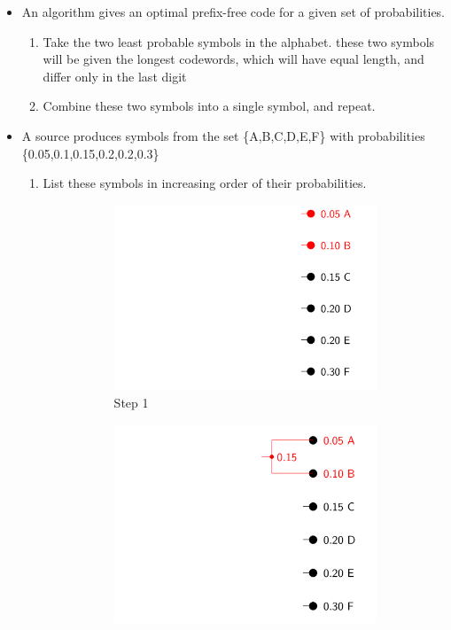 \documentclass[12pt]{article}
\begin{document}
\begin{itemize}
\item An algorithm gives an optimal prefix-free code for a given set of probabilities.
\begin{enumerate}
\item Take the two least probable symbols in the alphabet. these two symbols will be given the longest codewords, which will have equal length, and differ only in the last digit
\item Combine these two symbols into a single symbol, and repeat.
\end{enumerate}

\item A source produces symbols from the set \{A,B,C,D,E,F\} with probabilities \{0.05,0.1,0.15,0.2,0.2,0.3\}
\begin{enumerate}
\item List these symbols in increasing order of their probabilities.
\begin{figure}[h]
\begin{subfigure}[h]{0.3\linewidth}
  \includegraphics[width=\linewidth]{Huff1.png}
  \caption{Step 1}
\end{subfigure}
\begin{subfigure}[h]{0.3\linewidth}
  \includegraphics[width=\linewidth] {Huff2.png}

\end{subfigure}
\end{figure}
\end{enumerate}
\end{itemize}
\end{document}
